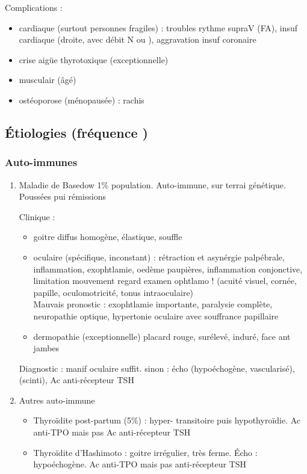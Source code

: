 \documentclass[11pt]{article}
\begin{document}
Complications : 
\begin{itemize}
\item cardiaque (surtout personnes fragiles) : troubles rythme supraV (FA), insuf
cardiaque (droite, avec débit N ou \inc), aggravation insuf coronaire
\item crise aigüe thyrotoxique (exceptionnelle)
\item musculair (âgé)
\item ostéoporose (\female ménopausée) : rachis
\end{itemize}

\subsection{Étiologies (fréquence \dec)}
\label{sec:org66a4382}
\subsubsection{Auto-immunes}
\label{sec:org45e9f8d}
\begin{enumerate}
\item Maladie de Basedow
\label{sec:org6cb934d}
1\% population. Auto-immune, sur terrai génétique. Poussées pui rémissions

Clinique : 
\begin{itemize}
\item goitre diffus homogène, élastique, souffle
\item oculaire (spécifique, inconstant) : rétraction et asynérgie palpébrale,
inflammation, exophtlamie, oedème paupières, inflammation conjonctive,
limitation mouvement regard
\thus examen ophtlamo ! (acuité visuel, cornée, papille, oculomotricité, tonus
intraoculaire)\\
Mauvais pronostic : exophtlamie importante, paralysie complète, neuropathie
optique, hypertonie oculaire avec souffrance papillaire
\item dermopathie (exceptionnelle) placard rouge, surélevé, induré, face ant jambes
\end{itemize}

Diagnostic : manif oculaire suffit. sinon : écho (hypoéchogène, vascularisé),
(scinti), Ac anti-récepteur TSH

\item Autres auto-immune
\label{sec:org66de336}
\begin{itemize}
\item Thyroïdite post-partum (5\%) : hyper- transitoire puis hypothyroïdie. Ac
anti-TPO mais pas Ac anti-récepteur TSH
\item Thyroïdite d'Hashimoto : goitre irrégulier, très ferme. Écho :
hypoéchogène. Ac anti-TPO mais pas anti-récepteur TSH
\end{itemize}
\end{enumerate}
\end{document}
